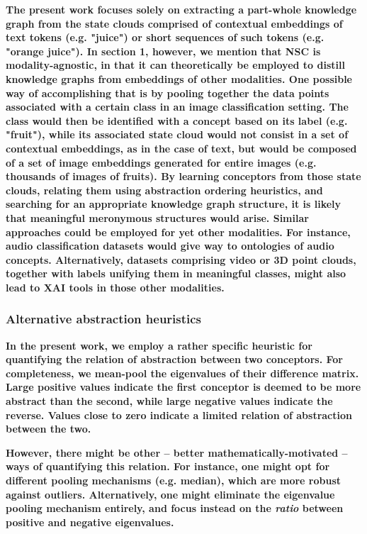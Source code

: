 \textbf{The present work focuses solely on extracting a part-whole knowledge graph from the state clouds comprised of contextual embeddings of text tokens (e.g. "juice") or short sequences of such tokens (e.g. "orange juice"). In section 1, however, we mention that NSC is modality-agnostic, in that it can theoretically be employed to distill knowledge graphs from embeddings of other modalities. One possible way of accomplishing that is by pooling together the data points associated with a certain class in an image classification setting. The class would then be identified with a concept based on its label (e.g. "fruit"), while its associated state cloud would not consist in a set of contextual embeddings, as in the case of text, but would be composed of a set of image embeddings generated for entire images (e.g. thousands of images of fruits). By learning conceptors from those state clouds, relating them using abstraction ordering heuristics, and searching for an appropriate knowledge graph structure, it is likely that meaningful meronymous structures would arise. Similar approaches could be employed for yet other modalities. For instance, audio classification datasets would give way to ontologies of audio concepts. Alternatively, datasets comprising video or 3D point clouds, together with labels unifying them in meaningful classes, might also lead to XAI tools in those other modalities.}

\subsubsection{Alternative abstraction heuristics}

\textbf{In the present work, we employ a rather specific heuristic for quantifying the relation of abstraction between two conceptors. For completeness, we mean-pool the eigenvalues of their difference matrix. Large positive values indicate the first conceptor is deemed to be more abstract than the second, while large negative values indicate the reverse. Values close to zero indicate a limited relation of abstraction between the two.}

\textbf{However, there might be other -- better mathematically-motivated -- ways of quantifying this relation. For instance, one might opt for different pooling mechanisms (e.g. median), which are more robust against outliers. Alternatively, one might eliminate the eigenvalue pooling mechanism entirely, and focus instead on the \textit{ratio} between positive and negative eigenvalues.}


